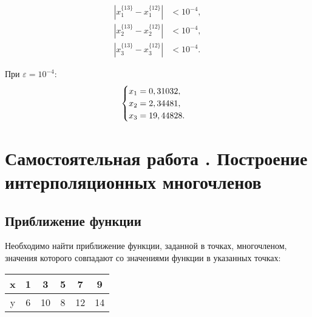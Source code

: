 \documentclass[10pt, a4paper, titlepage]{article}
\begin{document}
\begin{align*}
|x_1^{\{13\}}-x_1^{\{12\}}| &< 10^{-4}, \\
|x_2^{\{13\}}-x_2^{\{12\}}| &< 10^{-4}, \\
|x_3^{\{13\}}-x_3^{\{12\}}| &< 10^{-4}.
\end{align*}

При $\varepsilon=10^{-4}$:
\begin{equation*}
    \begin{cases}
        $$x_1=0,31032$$, \\
        $$x_2=2,34481$$, \\
        $$x_3=19,44828$$.
    \end{cases}
\end{equation*}

\section{Самостоятельная работа . Построение интерполяционных многочленов}

\subsection*{Приближение функции}

Необходимо найти приближение функции, заданной в точках, многочленом, значения которого совпадают со значениями функции в указанных точках:

\begin{center}
    \begin{tabular}{|c|c|c|c|c|c|}
         \hline
         x & 1 & 3 & 5 & 7 & 9 \\ \hline
         y & 6 & 10 & 8 & 12 & 14 \\
         \hline
    \end{tabular}
\end{center}
\end{document}
